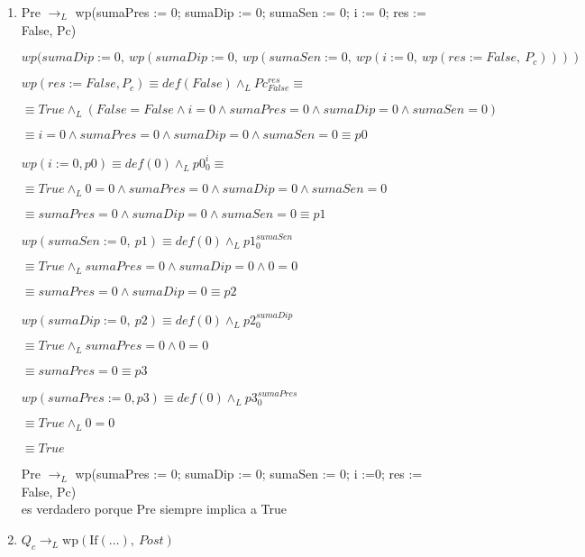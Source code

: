 \documentclass[10pt,a4paper]{article}
\begin{document}
\begin{enumerate}
    \item  Pre $\longrightarrow_{L}$ wp(sumaPres := 0; sumaDip := 0; sumaSen := 0; i := 0; res := False, Pc)
    \vspace{3mm} 

    $wp(sumaDip := 0, \: wp(sumaDip := 0, \: wp(sumaSen := 0, \: wp(i := 0, \: wp(res := False, \: P_c))))$

    \quad $wp(res := False, P_c) \equiv def(False) \land_L  Pc^{res}_{False} \equiv$

    \quad\quad $\equiv True \land_L (False = False \land i = 0 \land sumaPres = 0 \land sumaDip = 0 \land sumaSen = 0)$

    \quad\quad $\equiv i = 0 \land sumaPres = 0 \land sumaDip = 0 \land sumaSen = 0 \equiv p0$
    
    \quad $wp(i := 0, p0) \equiv def(0) \land_L  p0^i_0 \equiv$

    \quad\quad $\equiv True \land_L 0 = 0 \land sumaPres = 0 \land sumaDip = 0 \land sumaSen = 0 $

    \quad\quad $\equiv sumaPres = 0 \land sumaDip = 0 \land sumaSen = 0 \equiv p1$

    \quad $wp(sumaSen := 0, \: p1) \equiv def(0) \land_L p1^{sumaSen}_0$

    \quad\quad $\equiv True \land_L sumaPres = 0 \land sumaDip = 0 \land 0 = 0$

    \quad\quad $ \equiv sumaPres = 0 \land sumaDip = 0 \equiv p2$

    \quad $wp(sumaDip := 0, \: p2) \equiv def(0) \land_L p2^{sumaDip}_0$

    \quad\quad $\equiv True \land_L sumaPres = 0 \land 0 = 0$

    \quad\quad $\equiv sumaPres = 0 \equiv p3$

    \quad $wp(sumaPres := 0, p3) \equiv def(0) \land_L p3^{sumaPres}_0 $

    \quad\quad $\equiv True \land_L 0 = 0$  

    \quad\quad$ \equiv True $ 

\vspace{3mm} 
{Pre $\longrightarrow_{L}$ wp(sumaPres := 0; sumaDip := 0; sumaSen := 0; i :=0; res := False, Pc) \\ es verdadero porque Pre siempre implica a True }
\vspace{5mm} 

\item $Q_c \longrightarrow_{L} \text{wp}(\text{If}(\ldots), \: Post)$ 
\vspace{3mm}


\end{enumerate}
\end{document}
